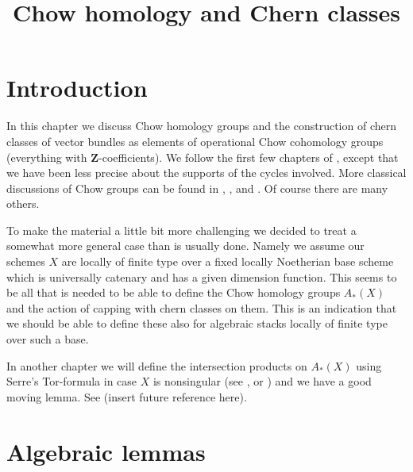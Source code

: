 

%


\title{Chow homology and Chern classes}

\maketitle

\label{section-phantom}


\tableofcontents



\section{Introduction}
\label{section-introduction}

\noindent
In this chapter we discuss Chow homology groups and the construction
of chern classes of vector bundles as elements of operational
Chow cohomology groups (everything with $\mathbf{Z}$-coefficients).
We follow the first few chapters of \cite{F}, except that we have been
less precise about the supports of the cycles involved.
More classical discussions of Chow groups can be found in
\cite{Samuel}, \cite{ChevalleyI}, and \cite{ChevalleyII}.
Of course there are many others.

\medskip\noindent
To make the material a little bit more challenging we decided
to treat a somewhat more general case than is usually done.
Namely we assume our schemes $X$ are locally of finite type
over a fixed locally Noetherian base scheme which is universally
catenary and has a given dimension function. This seems to be
all that is needed to be able to define the Chow homology
groups $A_*(X)$ and the action of capping with chern classes
on them. This is an indication that we should be able to define
these also for algebraic stacks locally of finite type over such
a base.

\medskip\noindent
In another chapter we will define the intersection products
on $A_*(X)$ using Serre's Tor-formula in case $X$ is nonsingular
(see \cite{Serre_local_algebra}, or \cite{Serre_algebre_locale})
and we have a good moving lemma. See (insert future reference here).



\section{Algebraic lemmas}
\label{section-algebraic-lemmas}

